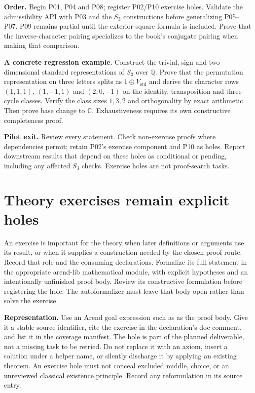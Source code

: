 \documentclass[11pt,a4paper]{article}
\newcommand{\code}[1]{\texttt{\detokenize{#1}}}
\newcommand{\C}{\mathbb C}
\newcommand{\Q}{\mathbb Q}
\begin{document}
\textbf{Order.} Begin P01, P04 and P08; register P02/P10 exercise holes.
Validate the admissibility API with P03 and the $S_3$ constructions before
generalizing P05--P07. P09 remains partial until the exterior-square formula
is included. Prove that the inverse-character pairing specializes to the
book's conjugate pairing when making that comparison.

\textbf{A concrete regression example.} Construct the trivial, sign and
two-dimensional standard representations of $S_3$ over $\Q$. Prove that the permutation
representation on three letters splits as $1\oplus V_{\mathrm{std}}$ and derive
the character rows $(1,1,1)$, $(1,-1,1)$ and $(2,0,-1)$ on the identity,
transposition and three-cycle classes. Verify the class sizes $1,3,2$ and
orthogonality by exact arithmetic. Then prove base change to $\C$.
Exhaustiveness requires its own constructive completeness proof.

\textbf{Pilot exit.} Review every statement. Check non-exercise proofs where
dependencies permit; retain P02's exercise component and P10 as holes.
Report downstream results that depend on these holes as conditional or pending,
including any affected $S_3$ checks. Exercise holes are not proof-search tasks.

\newpage
\section{Theory exercises remain explicit holes}\label{sec:exercises}
An exercise is important for the theory when later definitions or arguments
use its result, or when it supplies a construction needed by the chosen proof
route. Record that role and the consuming declarations. Formalize its full
statement in the appropriate arend-lib mathematical module, with explicit
hypotheses and an intentionally unfinished proof body. Review its constructive
formulation before registering the hole. The autoformalizer
must leave that body open rather than solve the exercise.

\textbf{Representation.} Use an Arend goal expression such as
\code{{?FH_L01_Ex1_2}} as the proof body. Give it a stable source identifier,
cite the exercise in the declaration's doc comment, and list it in the
coverage manifest. The hole is part of the planned deliverable, not a missing
task to be retried. Do not replace it with an axiom, insert a solution under
a helper name, or silently discharge it by applying an existing theorem.
An exercise hole must not conceal excluded middle, choice, or an unreviewed
classical existence principle. Record any reformulation in its source entry.
\end{document}
